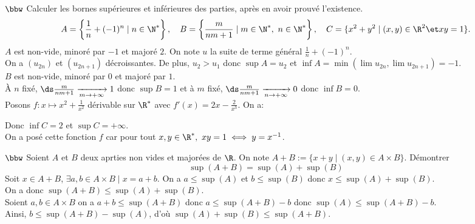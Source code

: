 \documentclass[11pt]{article}
\begin{document}
\begin{exercice}{$\bbw$}{}
    Calculer les bornes supérieures et inférieures des parties, après en avoir prouvé l'existence.
    \begin{equation*}
        A=\left\{ \frac{1}{n}+(-1)^n \mid n \in \N^* \right\}, \quad B = \left\{ \frac{m}{nm+1} \mid m \in \N^*, ~ n\in \N^* \right\}, \quad C =\{x^2+y^2 \mid (x,y)\in\R^2 \et xy=1\}.
    \end{equation*}
    \tcblower
     $A$ est non-vide, minoré par $-1$ et majoré $2$. On note $u$ la suite de terme général $\frac{1}{n}+(-1)^n$.\\
    On a $(u_{2n})$ et $(u_{2n+1})$ décroissantes. De plus, $u_2>u_1$ donc $\sup A = u_2$ et $\inf A = \min(\lim u_{2n}, \lim u_{2n+1})=-1$.\\
     $B$ est non-vide, minoré par $0$ et majoré par $1$.\\
    À $n$ fixé, $\ds\frac{m}{nm+1}\xrightarrow[m\to+\infty]{}1$ donc $\sup B = 1$ et à $m$ fixé, $\ds\frac{m}{nm+1}\xrightarrow[n\to+\infty]{}0$ donc $\inf B = 0$.\\
     Posons $f:x\mapsto x^2 + \frac{1}{x^2}$ dérivable sur $\R^*$ avec $f'(x)=2x-\frac{2}{x^3}$. On a:
    \begin{center}
    \end{center}
    Donc $\inf C = 2$ et $\sup C = +\infty$.\\
    On a posé cette fonction $f$ car pour tout $x,y\in\R^*,~xy=1 \iff y = x^{-1}$.
\end{exercice}

\begin{exercice}{$\bbw$}{}
    Soient $A$ et $B$ deux aprties non vides et majorées de $\R$. On note $A+B:=\{x+y\mid (x,y)\in A\times B\}$. Démontrer
    \begin{equation*}
        \sup(A+B)=\sup(A)+\sup(B)
    \end{equation*}
    \tcblower
    \boxed{\leq} Soit $x\in A+B$, $\exists a,b \in A\times B \mid x = a + b$. On a $a\leq\sup(A)$ et $b\leq\sup(B)$ donc $x\leq\sup(A)+\sup(B)$.\\
    On a donc $\sup(A+B)\leq\sup(A)+\sup(B)$.\\
    \boxed{\geq} Soient $a,b\in A\times B$ on a $a+b\leq\sup(A+B)$ donc $a\leq\sup(A+B)-b$ donc $\sup(A)\leq\sup(A+B)-b$.\\
    Ainsi, $b\leq\sup(A+B) - \sup(A)$, d'où $\sup(A)+\sup(B)\leq\sup(A+B)$.
\end{exercice}
\end{document}
